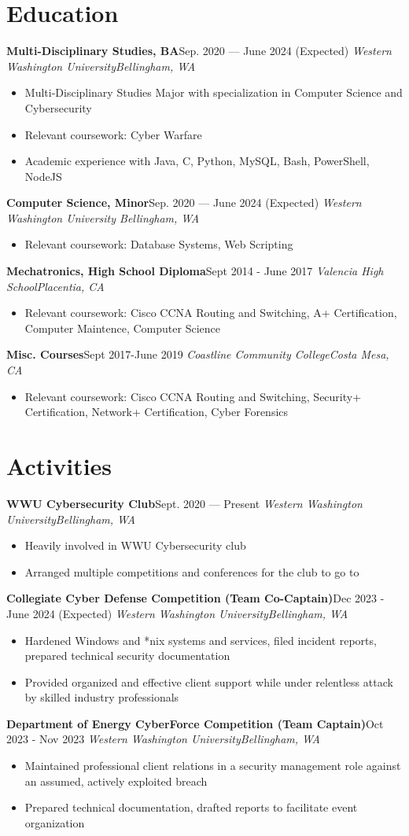 \documentclass{article}
\newcommand{\topLevelItem}[4]{
    \textbf{#1}\hfill #4\newline
    \emph{#2\hfill #3}\newline
    \vspace{-18pt}\begin{itemize}
}
\newcommand{\topLevelItemEnd}{\end{itemize}\vspace{5pt}}
\newcommand{\lowLevelItem}[1]{
    \item\small{#1}\vspace{-8pt}
}
\begin{document}
    \section*{Education}
        \topLevelItem{Multi-Disciplinary Studies, BA}{Western Washington University}{Bellingham, WA}{Sep. 2020 — June 2024 (Expected)}
            \lowLevelItem{Multi-Disciplinary Studies Major with specialization in Computer Science and Cybersecurity}
            \lowLevelItem{Relevant coursework: Cyber Warfare}
            \lowLevelItem{Academic experience with Java, C, Python, MySQL, Bash, PowerShell, NodeJS}
        \topLevelItemEnd
        \topLevelItem{Computer Science, Minor}{Western Washington University }{Bellingham, WA}{Sep. 2020 — June 2024 (Expected)}
            \lowLevelItem{Relevant coursework: Database Systems, Web Scripting}
        \topLevelItemEnd
        \topLevelItem{Mechatronics, High School Diploma}{Valencia High School}{Placentia, CA}{Sept 2014 - June 2017}
            \lowLevelItem{Relevant coursework: Cisco CCNA Routing and Switching, A+ Certification, Computer Maintence, Computer Science}
        \topLevelItemEnd
        \topLevelItem{Misc. Courses}{Coastline Community College}{Costa Mesa, CA}{Sept 2017-June 2019}
            \lowLevelItem{Relevant coursework: Cisco CCNA Routing and Switching, Security+ Certification, Network+ Certification, Cyber Forensics}
        \topLevelItemEnd
        
    \section*{Activities}
        \topLevelItem{WWU Cybersecurity Club}{Western Washington University}{Bellingham, WA}{Sept. 2020 — Present}
            \lowLevelItem{Heavily involved in WWU Cybersecurity club}
            \lowLevelItem{Arranged multiple competitions and conferences for the club to go to}
        \topLevelItemEnd
        \topLevelItem{Collegiate Cyber Defense Competition (Team Co-Captain)}{Western Washington University}{Bellingham, WA}{Dec 2023 - June 2024 (Expected)}
            \lowLevelItem{Hardened Windows and *nix systems and services, filed incident reports, prepared technical security documentation}
            \lowLevelItem{Provided organized and effective client support while under relentless attack by skilled industry professionals}
        \topLevelItemEnd
        \topLevelItem{Department of Energy CyberForce Competition (Team Captain)}{Western Washington University}{Bellingham, WA}{Oct 2023 - Nov 2023}
            \lowLevelItem{Maintained professional client relations in a security management role against an assumed, actively exploited breach}
            \lowLevelItem{Prepared technical documentation, drafted reports to facilitate event organization}
        \topLevelItemEnd
        
\end{document}
